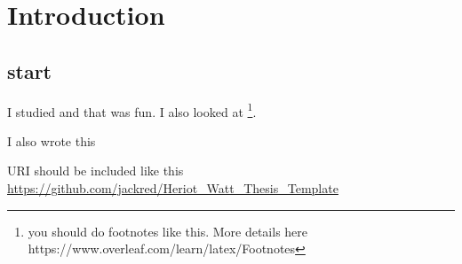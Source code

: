 \documentclass[../Thesis]{subfiles}
\begin{document}
\chapter{Introduction}

\section{start}

I studied \autocite{C01} and that was fun. I also looked at \autocite{C02} \footnote{you should do footnotes like this. More details here https://www.overleaf.com/learn/latex/Footnotes}.

I also wrote this \autocite{C05}

URI should be included like this \url{https://github.com/jackred/Heriot_Watt_Thesis_Template}
\end{document}

